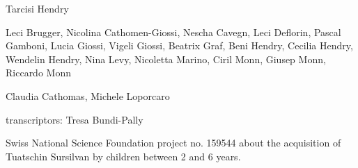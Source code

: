 
Tarcisi Hendry

Leci Brugger, Nicolina Cathomen-Giossi, Nescha Cavegn, Leci Deflorin, Pascal Gamboni, Lucia Giossi, Vigeli Giossi, Beatrix Graf, Beni Hendry, Cecilia Hendry, Wendelin Hendry, Nina Levy, Nicoletta Marino, Ciril Monn, Giusep Monn, Riccardo Monn



Claudia Cathomas, Michele Loporcaro

transcriptors: Tresa Bundi-Pally


Swiss National Science Foundation project no. 159544 about the acquisition of Tuatschin Sursilvan by children between 2 and 6 years.



